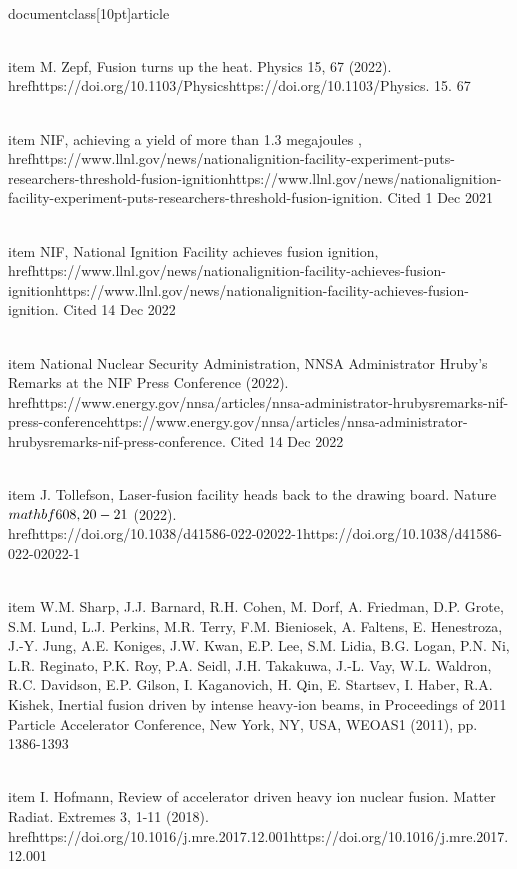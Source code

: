 \\documentclass[10pt]{article}
\begin{document}
{{{{{{  \\item M. Zepf, Fusion turns up the heat. Physics 15, 67 (2022). \\href{https://doi.org/10.1103/Physics}{https://doi.org/10.1103/Physics}. 15. 67

  \\item NIF, achieving a yield of more than 1.3 megajoules ,\\href{https://www.llnl.gov/news/nationalignition-facility-experiment-puts-researchers-threshold-fusion-ignition}{https://www.llnl.gov/news/nationalignition-facility-experiment-puts-researchers-threshold-fusion-ignition}. Cited 1 Dec 2021

  \\item NIF, National Ignition Facility achieves fusion ignition, \\href{https://www.llnl.gov/news/nationalignition-facility-achieves-fusion-ignition}{https://www.llnl.gov/news/nationalignition-facility-achieves-fusion-ignition}. Cited 14 Dec 2022

  \\item National Nuclear Security Administration, NNSA Administrator Hruby's Remarks at the NIF Press Conference (2022). \\href{https://www.energy.gov/nnsa/articles/nnsa-administrator-hrubysremarks-nif-press-conference}{https://www.energy.gov/nnsa/articles/nnsa-administrator-hrubysremarks-nif-press-conference}. Cited 14 Dec 2022

  \\item J. Tollefson, Laser-fusion facility heads back to the drawing board. Nature $\\mathbf{6 0 8}, 20-21$ (2022). \\href{https://doi.org/10.1038/d41586-022-02022-1}{https://doi.org/10.1038/d41586-022-02022-1}

  \\item W.M. Sharp, J.J. Barnard, R.H. Cohen, M. Dorf, A. Friedman, D.P. Grote, S.M. Lund, L.J. Perkins, M.R. Terry, F.M. Bieniosek, A. Faltens, E. Henestroza, J.-Y. Jung, A.E. Koniges, J.W. Kwan, E.P. Lee, S.M. Lidia, B.G. Logan, P.N. Ni, L.R. Reginato, P.K. Roy, P.A. Seidl, J.H. Takakuwa, J.-L. Vay, W.L. Waldron, R.C. Davidson, E.P. Gilson, I. Kaganovich, H. Qin, E. Startsev, I. Haber, R.A. Kishek, Inertial fusion driven by intense heavy-ion beams, in Proceedings of 2011 Particle Accelerator Conference, New York, NY, USA, WEOAS1 (2011), pp. 1386-1393

  \\item I. Hofmann, Review of accelerator driven heavy ion nuclear fusion. Matter Radiat. Extremes 3, 1-11 (2018). \\href{https://doi.org/10.1016/j.mre.2017.12.001}{https://doi.org/10.1016/j.mre.2017.12.001}

}}}}}}
\end{document}
